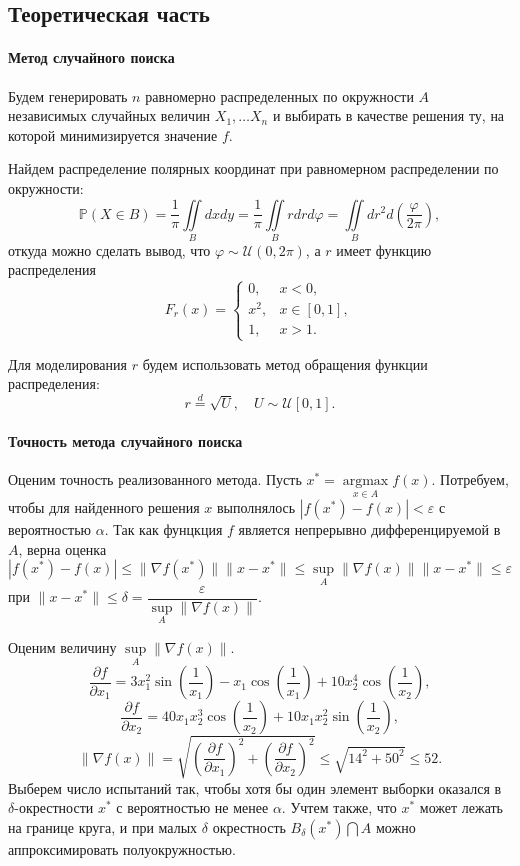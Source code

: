\documentclass[16pt]{article}
\begin{document}
\subsection{Теоретическая часть}
\paragraph{Метод случайного поиска} Будем генерировать $n$ равномерно распределенных по окружности $A$ независимых случайных величин $X_1, \ldots X_n$ и выбирать в качестве решения ту, на которой минимизируется значение $f$.

Найдем распределение полярных координат при равномерном распределении по окружности:
$$\mathbb{P}(X \in B) = \dfrac{1}{\pi}\iint\limits_Bdxdy = \dfrac{1}{\pi}\iint\limits_Brdrd\varphi = \iint\limits_Bdr^2d\left(\dfrac{\varphi}{2\pi}\right),$$
откуда можно сделать вывод, что $\varphi \sim \mathcal{U}(0, 2\pi)$, а $r$ имеет функцию распределения
$$F_r(x) = 
\begin{cases}
0, &x < 0, \\
x^2, &x \in [0, 1], \\
1, &x > 1.
\end{cases}$$

Для моделирования $r$ будем использовать метод обращения функции распределения:
$$r \overset{d}{=} \sqrt{U}, \quad U \sim \mathcal{U}[0, 1].$$

\paragraph{Точность метода случайного поиска}
Оценим точность реализованного метода. Пусть $x^* = \underset{x \in A}{\operatorname{argmax}}  f(x)$. Потребуем, чтобы для найденного решения $x$ выполнялось $|f(x^*) - f(x)| < \varepsilon$ с вероятностью $\alpha$. Так как фунцкция $f$ является непрерывно дифференцируемой в $A$, верна оценка
$$|f(x^*) - f(x)| \leq \|\nabla f(x^*)\| \|x - x^*\| \leq \sup_A \|\nabla f(x)\|\|x - x^*\| \leq \varepsilon$$
при $\|x - x^*\| \leq \delta = \dfrac{\varepsilon}{\sup\limits_A \|\nabla f(x)\|}$.

Оценим величину $\sup\limits_A \|\nabla f(x)\|$.
$$\dfrac{\partial f}{\partial x_1} = 3x_1^2\sin\left(\dfrac{1}{x_1}\right) - x_1\cos\left(\dfrac{1}{x_1}\right) + 10x_2^4\cos\left(\dfrac{1}{x_2}\right),$$
$$\dfrac{\partial f}{\partial x_2} = 40x_1x_2^3 \cos\left(\dfrac{1}{x_2}\right) + 10x_1x_2^2\sin\left(\dfrac{1}{x_2}\right),$$
$$\|\nabla f(x)\| = \sqrt{\left(\dfrac{\partial f}{\partial x_1}\right)^2 + \left(\dfrac{\partial f}{\partial x_2}\right)^2} \leq \sqrt{14^2 + 50^2} \leq 52.$$
Выберем число испытаний так, чтобы хотя бы один элемент выборки оказался в $\delta$-окрестности $x^*$ с вероятностью не менее $\alpha$. Учтем также, что $x^*$ может лежать на границе круга, и при малых $\delta$ окрестность $B_\delta(x^*) \bigcap A$ можно аппроксимировать полуокружностью.
\end{document}
